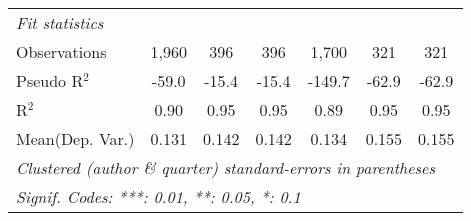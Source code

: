 \begin{tabular}{lcccccc}
   \midrule
   \emph{Fit statistics}\\
   Observations            & 1,960   & 396     & 396          & 1,700   & 321     & 321\\  
   Pseudo R$^2$            & -59.0   & -15.4   & -15.4        & -149.7  & -62.9   & -62.9\\  
   R$^2$                   & 0.90    & 0.95    & 0.95         & 0.89    & 0.95    & 0.95\\  
Mean(Dep. Var.) & 0.131 & 0.142 & 0.142 & 0.134 & 0.155 & 0.155 \\
   \midrule \midrule
   \multicolumn{7}{l}{\emph{Clustered (author \& quarter) standard-errors in parentheses}}\\
   \multicolumn{7}{l}{\emph{Signif. Codes: ***: 0.01, **: 0.05, *: 0.1}}\\
\end{tabular}
\par\endgroup
